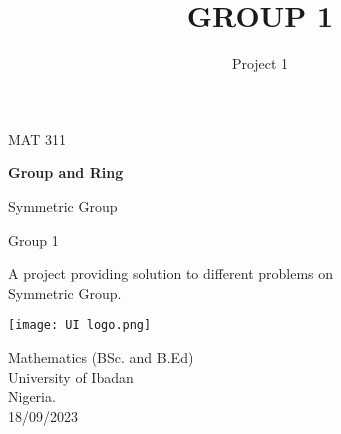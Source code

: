 \documentclass{article}
\title{GROUP 1}
\author{Project 1}
\begin{document}
\begin{titlepage}
    \begin{center}
        {\fontsize{70}{70}\selectfont MAT 311}
        
        \vspace{1cm}
        \Huge
        \textbf{Group and Ring}
        
        \vspace{0.5cm}
        \LARGE
        Symmetric Group
        
        \vspace{0.5cm}
        {\fontsize{50}{50}\selectfont Group 1}
        \vspace{0.6cm}        
            
        A project providing solution to  different problems on \\ Symmetric Group.
        \vspace{0.8cm}
            
        \texttt{[image: UI logo.png]}

        \vspace{1.0cm}
        
        \Large{
         Mathematics (BSc. and B.Ed)\\
        University of Ibadan\\
        Nigeria.\\
        18/09/2023}
            
    \end{center}
\end{titlepage}
\tableofcontents
\end{document}
